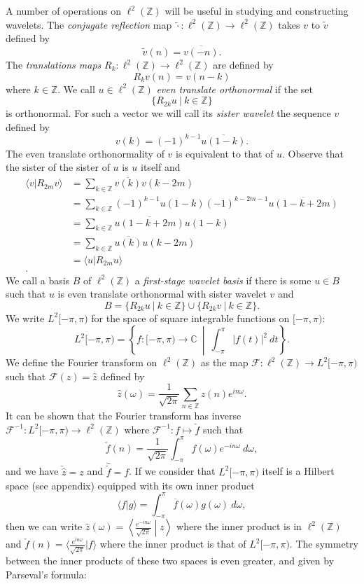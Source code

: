 \documentclass{report}
\newcommand{\Z}{\mathbb{Z}}
\newcommand{\C}{\mathbb{C}}
\newcommand{\F}{\mathcal{F}}
\begin{document}
A number of operations on $\ell^2 (\Z)$ will be useful in studying and constructing wavelets.
The \emph{conjugate reflection} map  $\tilde {\cdot}: \ell^2 (\Z) \to \ell^2 (\Z)$ takes $v$ to $\tilde v$ defined by
$$
\tilde v (n) = \overline{v(-n)}.
$$
The \emph{translations maps} $R_k: \ell^2 (\Z) \to \ell^2 (\Z)$ are defined by
$$
R_kv(n)=v(n-k)
$$
where $k \in \Z$. We call $u \in \ell^2(\Z)$ \emph{even translate orthonormal} if the set
$$
\{R_{2k}u \ | \ k \in \Z\}
$$
is orthonormal. For such a vector we will call its \emph{sister wavelet} the sequence $v$ defined by
$$
v(k)=(-1)^{k-1}\overline{u(1-k)}.
$$
The even translate orthonormality of $v$ is equivalent to that of $u$. Observe that the sister of the sister of $u$ is $u$ itself and
\begin{align*}
\langle v | R_{2m} v \rangle &= \sum_{k \in \Z}\overline{v(k)}{v(k-2m)}\\
 &= \sum_{k \in \Z}(-1)^{k-1}{u(1-k)}(-1)^{k-2m-1}\overline{u(1-k+2m)}\\
  &= \sum_{k \in \Z}\overline{u(1-k+2m)}{u(1-k)}\\
    &= \sum_{k \in \Z}\overline{u(k)}{u(k-2m)}\\
    &= \langle u | R_{2m} u \rangle\\.
\end{align*}
We call a basis $B$ of $\ell^2 (\Z)$ a \emph{first-stage wavelet basis} if there is some $u \in B$ such that $u$ is even translate orthonormal with sister wavelet $v$ and
$$B=\{R_{2k}u \ | \ k \in \Z \}\cup\{R_{2k}v \ | \ k \in \Z \}.$$
We write $L^2 [-\pi,\pi)$ for the space of square integrable functions on  $[-\pi,\pi)$:
$$
L^2 [-\pi,\pi)=\left\{ f: [-\pi,\pi) \to \C \ \middle | \ \int_{-\pi}^\pi |f(t)|^2  \ dt\right\}.
$$ 
We define the Fourier transform on $\ell^2 (\Z)$ as the map $\F: \ell^2 (\Z) \to L^2 [-\pi,\pi) $ such that $\F(z)=\hat z$ defined by
$$
\hat z (\omega) = \frac 1 {\sqrt {2\pi}} \sum_{n \in \Z} z(n)e^{in\omega}.
$$
It can be shown that the Fourier transform has inverse $\F^{-1}: L^2[-\pi,\pi) \to \ell^2(\Z)$ where  $\F^{-1}: f \mapsto \check{f}$ such that
 $$
 \check f (n) = \frac 1 {\sqrt{2 \pi}} \int_{-\pi}^{\pi} f(\omega)e^{-in\omega} \ d\omega,
 $$
and we have $\check{\hat{z}}=z$ and $\hat{\check{f}} =f$. If we consider that $L^2 [-\pi,\pi)$ itself is a Hilbert space (see appendix) equipped with its own inner product 
$$
\langle f | g \rangle=\int_{-\pi}^{\pi} \overline{f}(\omega)g(\omega) \ d\omega,
$$
then we can write $\hat z (\omega) =\left \langle \frac{e^{-in\omega}}{\sqrt{2\pi}} \middle |z \right \rangle$ where the inner product is in $\ell^2 (\Z)$ and $\check f (n) =\langle \frac{e^{in\omega}}{\sqrt{2\pi}}|f \rangle$ where the inner product is that of $L^2 [-\pi,\pi)$. The symmetry between the inner products of these two spaces is even greater, and given by Parseval's formula:
\end{document}
